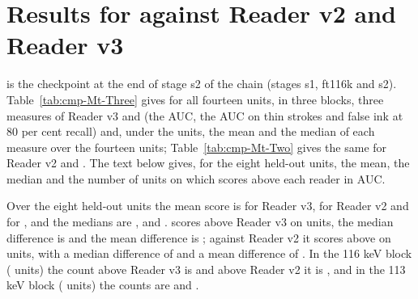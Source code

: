 \section{Results for \MtName{} against Reader v2 and Reader v3}\label{sec:results-Mt}

\MtName{} is the checkpoint at the end of stage s2 of the chain (stages s1, ft116k and s2). Table~\ref{tab:cmp-Mt-Three} gives for all fourteen units, in three blocks, three measures of Reader v3 and \MtName{} (the AUC, the AUC on thin strokes and false ink at 80 per cent recall) and, under the units, the mean and the median of each measure over the fourteen units; Table~\ref{tab:cmp-Mt-Two} gives the same for Reader v2 and \MtName{}. The text below gives, for the eight held-out units, the mean, the median and the number of units on which \MtName{} scores above each reader in AUC.

\begin{table}[!t]
\caption{Three measures of \MtName{} against Reader v3 on the fourteen units: the AUC, the AUC on thin
strokes and false ink at 80 per cent recall. The cell of \MtName{} gives in parentheses the signed difference
against Reader v3. The rows Mean and Median are taken over all fourteen units; the
block of the community labels is information only.}\label{tab:cmp-Mt-Three}
\centering

\par\smallskip
{\footnotesize\raggedright\par}
\end{table}

\begin{table}[!t]
\caption{Three measures of \MtName{} against Reader v2 on the fourteen units, in the format of Table~\ref{tab:cmp-Mt-Three}. The cell of \MtName{} gives in parentheses the signed difference
against Reader v2. The rows Mean and Median are taken over all fourteen units; the
block of the community labels is information only.}\label{tab:cmp-Mt-Two}
\centering

\par\smallskip
{\footnotesize\raggedright\par}
\end{table}

Over the eight held-out units the mean score is \MtHeldMeanRThreeAuc{} for Reader v3, \MtHeldMeanRTwoAuc{} for Reader v2 and \MtHeldMeanOwnAuc{} for \MtName{}, and the medians are \MtHeldMedianRThreeAuc{}, \MtHeldMedianRTwoAuc{} and \MtHeldMedianOwnAuc{}. \MtName{} scores above Reader v3 on \MtHeldKTextThree{} units, the median difference is \MtHeldMedianDiffThreeAuc{} and the mean difference is \MtHeldMeanDiffThreeAuc{}; against Reader v2 it scores above on \MtHeldKTextTwo{} units, with a median difference of \MtHeldMedianDiffTwoAuc{} and a mean difference of \MtHeldMeanDiffTwoAuc{}. In the 116 keV block (\BlockLongN{} units) the count above Reader v3 is \MtBlockLongAboveThree{} and above Reader v2 it is \MtBlockLongAboveTwo{}, and in the 113 keV block (\BlockShortN{} units) the counts are \MtBlockShortAboveThree{} and \MtBlockShortAboveTwo{}.

